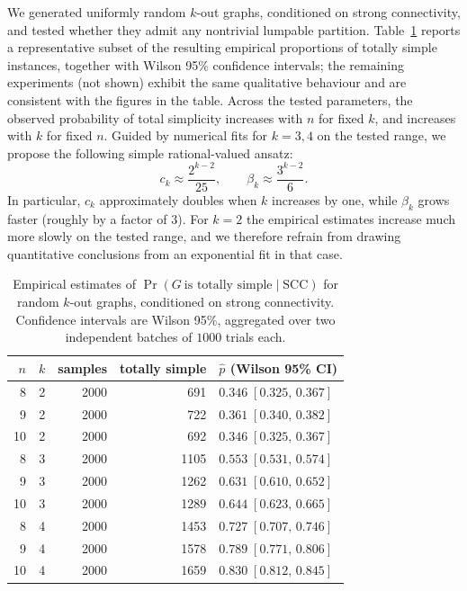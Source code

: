 \documentclass[a4paper,10pt]{amsart}
\theoremstyle{plain}
\theoremstyle{definition}
\begin{document}
We generated uniformly random $k$-out graphs, conditioned on strong connectivity, and tested whether they admit any nontrivial lumpable partition. Table~\ref{tab:totally-simple-experiments-agg} reports a representative subset of the resulting empirical proportions of totally simple instances, together with Wilson 95\% confidence intervals; the remaining experiments (not shown) exhibit the same qualitative behaviour and are consistent with the figures in the table.
Across the tested parameters, the observed probability of total simplicity increases with $n$ for fixed $k$, and increases
with $k$ for fixed $n$. Guided by numerical fits for $k=3,4$ on the tested range, we propose the following simple rational-valued ansatz:
\[
c_k \approx \frac{2^{k-2}}{25},
\qquad
\beta_k \approx \frac{3^{k-2}}{6}.
\]
In particular, $c_k$ approximately doubles when $k$ increases by one, while $\beta_k$ grows faster (roughly by a factor of $3$).
For $k=2$ the empirical estimates increase much more slowly on the tested range, and we therefore refrain from drawing
quantitative conclusions from an exponential fit in that case.
\begin{table}[t]
\centering
\begin{tabular}{|r|r|r|r|l|}
\hline
$n$ & $k$ & samples & totally simple & $\hat p$ (Wilson 95\% CI) \\
\hline
8  & 2 & 2000 & 691 & $0.346\;[0.325,\,0.367]$ \\
9  & 2 & 2000 & 722 & $0.361\;[0.340,\,0.382]$ \\
10 & 2 & 2000 & 692 & $0.346\;[0.325,\,0.367]$ \\
\hline
8  & 3 & 2000 & 1105 & $0.553\;[0.531,\,0.574]$ \\
9  & 3 & 2000 & 1262 & $0.631\;[0.610,\,0.652]$ \\
10 & 3 & 2000 & 1289 & $0.644\;[0.623,\,0.665]$ \\
\hline
8  & 4 & 2000 & 1453 & $0.727\;[0.707,\,0.746]$ \\
9  & 4 & 2000 & 1578 & $0.789\;[0.771,\,0.806]$ \\
10 & 4 & 2000 & 1659 & $0.830\;[0.812,\,0.845]$ \\
\hline
\end{tabular}
\caption{Empirical estimates of $\Pr(G\ \text{is totally simple}\mid \mathrm{SCC})$ for random $k$-out graphs,
conditioned on strong connectivity. Confidence intervals are Wilson 95\%, aggregated over two independent batches of $1000$ trials each.}
\label{tab:totally-simple-experiments-agg}
\end{table}
\end{document}
